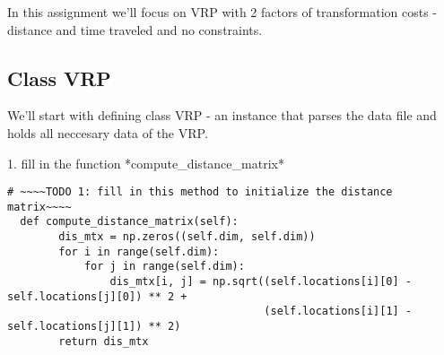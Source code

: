 \documentclass[letterpaper, 12pt]{article}
\begin{document}
In this assignment we'll focus on VRP with 2 factors of transformation costs - distance and time traveled and no constraints.\\

\subsection*{Class VRP}
We'll start with defining class VRP - an instance that parses the data file and holds all neccesary data of the VRP.

1. fill in the function *compute\_distance\_matrix*
\begin{lstlisting}
# ~~~~TODO 1: fill in this method to initialize the distance matrix~~~~
  def compute_distance_matrix(self):
        dis_mtx = np.zeros((self.dim, self.dim))
        for i in range(self.dim):
            for j in range(self.dim):
                dis_mtx[i, j] = np.sqrt((self.locations[i][0] - self.locations[j][0]) ** 2 +
                                        (self.locations[i][1] - self.locations[j][1]) ** 2)
        return dis_mtx
\end{lstlisting}
\end{document}
